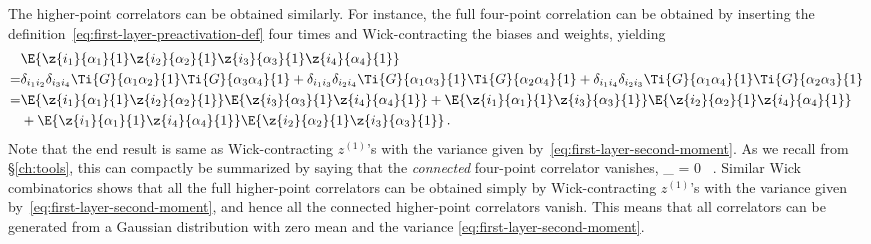 The higher-point correlators can be obtained similarly. For instance, the full four-point correlation can be obtained by inserting the definition~\eqref{eq:first-layer-preactivation-def} four times and Wick-contracting the biases and weights, yielding
\begin{align}\label{eq:first-layer-fourh-moment}
&\E{\z{i_1}{\alpha_1}{1}\z{i_2}{\alpha_2}{1}\z{i_3}{\alpha_3}{1}\z{i_4}{\alpha_4}{1}}\, \\
=&\delta_{i_1 i_2} \delta_{i_3 i_4} \Ti{G}{\alpha_1 \alpha_2}{1}\Ti{G}{\alpha_3 \alpha_4}{1}+\delta_{i_1 i_3} \delta_{i_2 i_4}\Ti{G}{\alpha_1 \alpha_3}{1}\Ti{G}{\alpha_2 \alpha_4}{1}+\delta_{i_1 i_4}\delta_{i_2 i_3} \Ti{G}{\alpha_1 \alpha_4}{1}\Ti{G}{\alpha_2 \alpha_3}{1}\,   \nonumber\\
=&\E{\z{i_1}{\alpha_1}{1}\z{i_2}{\alpha_2}{1}}\E{\z{i_3}{\alpha_3}{1}\z{i_4}{\alpha_4}{1}}+\E{\z{i_1}{\alpha_1}{1}\z{i_3}{\alpha_3}{1}}\E{\z{i_2}{\alpha_2}{1}\z{i_4}{\alpha_4}{1}}\, \nonumber\\
&+\E{\z{i_1}{\alpha_1}{1}\z{i_4}{\alpha_4}{1}}\E{\z{i_2}{\alpha_2}{1}\z{i_3}{\alpha_3}{1}}\,  .\nonumber
\end{align}
Note that the end result is same as Wick-contracting $z^{(1)}$'s with the variance given by~\eqref{eq:first-layer-second-moment}.  As we recall from \S\ref{ch:tools}, this can compactly be summarized by saying that the \emph{connected} four-point correlator vanishes,
\be
{}\Big\vert_{} = 0 \, .
\ee
Similar Wick combinatorics shows that all the full higher-point correlators can be obtained simply by Wick-contracting $z^{(1)}$'s with the variance given by~\eqref{eq:first-layer-second-moment}, and hence all the connected higher-point correlators vanish. 
This means that all correlators can be generated from a Gaussian distribution with zero mean and the variance \eqref{eq:first-layer-second-moment}.%


